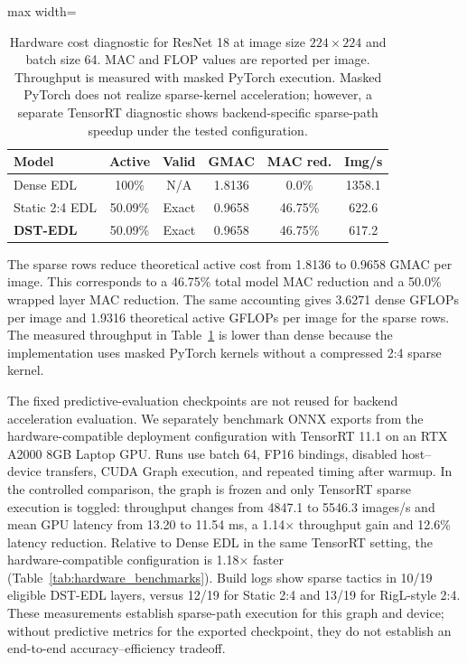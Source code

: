\documentclass[letterpaper]{article}
\begin{document}
\begin{table}[tbp]
\centering
\caption{Hardware cost diagnostic for ResNet 18 at image size $224\times224$ and batch size 64. MAC and FLOP values are reported per image. Throughput is measured with masked PyTorch execution. Masked PyTorch does not realize sparse-kernel acceleration; however, a separate TensorRT diagnostic shows backend-specific sparse-path speedup under the tested configuration.}
\label{tab:structural_cost}
\scriptsize
\renewcommand{\arraystretch}{1.05}
\setlength{\tabcolsep}{1.2pt}
\begin{adjustbox}{max width=\columnwidth}
\begin{tabular}{@{}l c c c c c@{}}
\toprule
\textbf{Model} & \textbf{Active} & \textbf{Valid} & \textbf{GMAC} & \textbf{MAC red.} & \textbf{Img/s} \\
\midrule
Dense EDL & 100\% & N/A & 1.8136 & 0.0\% & 1358.1 \\
Static 2:4 EDL & 50.09\% & Exact & 0.9658 & 46.75\% & 622.6 \\
\textbf{DST-EDL} & 50.09\% & Exact & 0.9658 & 46.75\% & 617.2 \\
\bottomrule
\end{tabular}
\end{adjustbox}
\end{table}

The sparse rows reduce theoretical active cost from 1.8136 to 0.9658 GMAC per
image. This corresponds to a 46.75\% total model MAC reduction and a 50.0\%
wrapped layer MAC reduction. The same accounting gives 3.6271 dense GFLOPs per
image and 1.9316 theoretical active GFLOPs per image for the sparse rows. The
measured throughput in Table~\ref{tab:structural_cost} is lower than dense because the implementation uses masked
PyTorch kernels without a compressed 2:4 sparse kernel. 

The fixed predictive-evaluation checkpoints are not reused for backend acceleration evaluation. We separately benchmark ONNX exports from the hardware-compatible deployment configuration with TensorRT 11.1 on an RTX A2000 8GB Laptop GPU. Runs use batch 64, FP16 bindings, disabled host--device transfers, CUDA Graph execution, and repeated timing after warmup. In the controlled comparison, the graph is frozen and only TensorRT sparse execution is toggled: throughput changes from 4847.1 to 5546.3 images/s and mean GPU latency from 13.20 to 11.54 ms, a 1.14$\times$ throughput gain and 12.6\% latency reduction. Relative to Dense EDL in the same TensorRT setting, the hardware-compatible configuration is 1.18$\times$ faster (Table~\ref{tab:hardware_benchmarks}). Build logs show sparse tactics in 10/19 eligible DST-EDL layers, versus 12/19 for Static 2:4 and 13/19 for RigL-style 2:4. These measurements establish sparse-path execution for this graph and device; without predictive metrics for the exported checkpoint, they do not establish an end-to-end accuracy--efficiency tradeoff.
\end{document}

